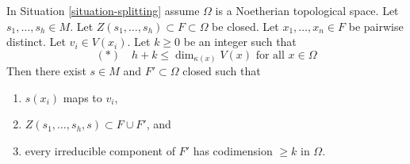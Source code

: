\begin{proposition}
\label{proposition-splitting}
\begin{reference}
\cite[Theorem 2]{Serre-projective}
\end{reference}
In Situation \ref{situation-splitting} assume $\Omega$ is
a Noetherian topological space. Let $s_1, \ldots, s_h \in M$.
Let $Z(s_1, \ldots, s_h) \subset F \subset \Omega$ be closed.
Let $x_1, \ldots, x_n \in F$ be pairwise distinct.
Let $v_i  \in V(x_i)$.
Let $k \geq 0$ be an integer such that
$$
(*)\quad h + k \leq \dim_{\kappa(x)} V(x)\text{ for all }x \in \Omega
$$
Then there exist $s \in M$ and $F' \subset \Omega$ closed such that
\begin{enumerate}
\item[(a)] $s(x_i)$ maps to $v_i$,
\item[(b)] $Z(s_1, \ldots, s_h, s) \subset F \cup F'$, and
\item[(c)] every irreducible component of $F'$ has
codimension $\geq k$ in $\Omega$.
\end{enumerate}
\end{proposition}

